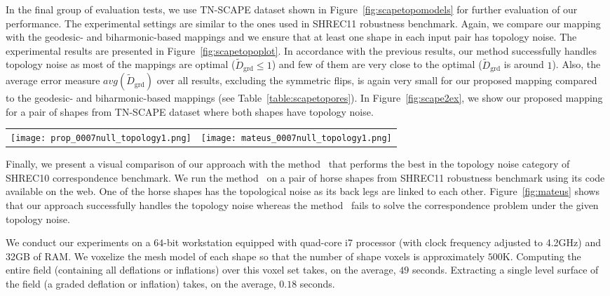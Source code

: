 In the final group of evaluation tests, we use TN-SCAPE dataset shown in Figure~\ref{fig:scapetopomodels} for further evaluation of our performance. The experimental settings are similar to the ones used in SHREC11 robustness benchmark. Again, we compare our mapping with the geodesic- and biharmonic-based mappings and we ensure that at least one shape in each input pair has topology noise. The experimental results are presented in Figure~\ref{fig:scapetopoplot}. In accordance with the previous results, our method successfully handles topology noise as most of the mappings are optimal (${\widetilde{D}_{\mathrm{grd}}} \le 1$) and few of them are very close to the optimal (${\widetilde{D}_{\mathrm{grd}}}$ is around $1$). Also, the average error measure $avg({\widetilde{D}_{\mathrm{grd}}})$ over all results, excluding the symmetric flips, is again very small for our proposed mapping compared to the geodesic- and biharmonic-based mappings (see Table~\ref{table:scapetopores}). In Figure~\ref{fig:scape2ex}, we show our proposed mapping for a pair of shapes from TN-SCAPE dataset where both shapes have topology noise.

\begin{figure*}[t!]
  \centering
  \begin{tabular}{cc}
  \texttt{[image: prop\_0007null\_topology1.png]} &
  \texttt{[image: mateus\_0007null\_topology1.png]}\\
  \end{tabular}
  \caption{\label{fig:mateus}
  A visual comparison of our approach with the method~\cite{Mateus08} that performs the best in the topology noise category of SHREC10 correspondence benchmark (Left) Our mapping result (Right) Dense mapping result obtained by the method~\cite{Mateus08}.
  }
\end{figure*}

Finally, we present a visual comparison of our approach with the method~\cite{Mateus08} that performs the best in the topology noise category of SHREC10 correspondence benchmark. We run the method~\cite{Mateus08} on a pair of horse shapes from SHREC11 robustness benchmark using its code available on the web. One of the horse shapes has the topological noise as its back legs are linked to each other. Figure~\ref{fig:mateus} shows that our approach successfully handles the topology noise whereas the method~\cite{Mateus08} fails to solve the correspondence problem under the given topology noise.

{We conduct our experiments on a $64$-bit workstation equipped with quad-core i7 processor (with clock frequency adjusted to 4.2GHz) and 32GB of RAM. We voxelize the mesh model of each shape so that the number of shape voxels is approximately $500$K. Computing the entire field (containing all deflations or inflations) over this voxel set takes, on the average,  $49$ seconds. Extracting a single level surface of the  field (a graded deflation or inflation) takes, on the average, $0.18$ seconds. }